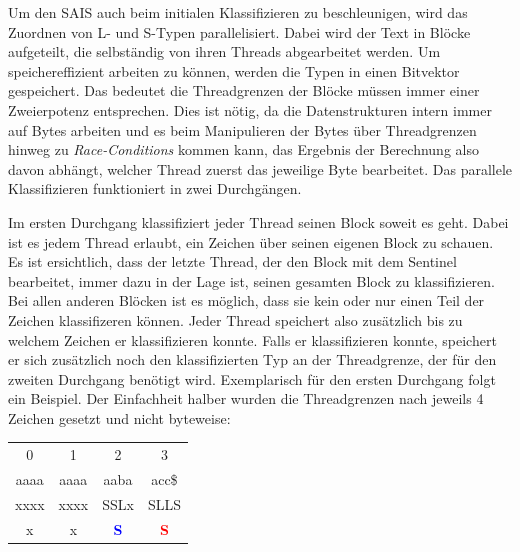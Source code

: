 Um den SAIS auch beim initialen Klassifizieren zu beschleunigen, wird das Zuordnen von L- und S-Typen parallelisiert. Dabei wird der Text in Blöcke aufgeteilt, die selbständig von ihren Threads abgearbeitet werden. Um speichereffizient arbeiten zu können, werden die Typen in einen Bitvektor gespeichert. Das bedeutet die Threadgrenzen der Blöcke müssen immer einer Zweierpotenz entsprechen. Dies ist nötig, da die Datenstrukturen intern immer auf Bytes arbeiten und es beim Manipulieren der Bytes über Threadgrenzen hinweg zu \textit{Race-Conditions} kommen kann, das Ergebnis der Berechnung also davon abhängt, welcher Thread zuerst das jeweilige Byte bearbeitet.
Das parallele Klassifizieren funktioniert in zwei Durchgängen. 

Im ersten Durchgang klassifiziert jeder Thread seinen Block soweit es geht. Dabei ist es jedem Thread erlaubt, ein Zeichen über seinen eigenen Block zu schauen. Es ist ersichtlich, dass der letzte Thread, der den Block mit dem Sentinel bearbeitet, immer dazu in der Lage ist, seinen gesamten Block zu klassifizieren. Bei allen anderen Blöcken ist es möglich, dass sie kein oder nur einen Teil der Zeichen klassifizeren können. Jeder Thread speichert also zusätzlich bis zu welchem Zeichen er klassifizieren konnte. Falls er klassifizieren konnte, speichert er sich zusätzlich noch den klassifizierten Typ an der Threadgrenze, der für den zweiten Durchgang benötigt wird.
Exemplarisch für den ersten Durchgang folgt ein Beispiel. Der Einfachheit halber wurden die Threadgrenzen nach jeweils 4 Zeichen gesetzt und nicht byteweise:

\begin{center}
	\begin{tabular}{c|c|c|c}     
	           0     &             1         &           2          			&             3    \\   
          	aaaa     &          aaaa         &        aaba           			&          acc\$    \\            
         	xxxx     &          xxxx         &        SSLx           			&          SLLS     \\     
         	  x      &            x          &   \textbf{\textcolor{blue}{S}}            &          \textbf{\textcolor{red}{S}}      \\            	       
	\end{tabular}
\end{center}


